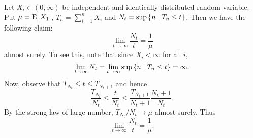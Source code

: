 \begin{example}
    Let $X_i\in(0,\infty)$ be independent and identically distributed random variable. 
    Put $\mu = \operatorname{E}\left[ {X_1} \right]$, $T_n = \sum_{i=1}^n X_i$ and $N_t = \sup\left\{ n \;\middle\vert\; T_n\leq t \right\}$. 
    Then we have the following claim: 
    \begin{equation*}
        \lim_{t\to\infty} \frac{N_t}{t} = \frac{1}{\mu} 
    \end{equation*}
    almost surely. To see this, note that since $X_i<\infty$ for all $i$, 
    \begin{equation*}
        \lim_{t\to\infty} N_t = \lim_{t\to\infty}\sup\left\{ n \;\middle\vert\; T_n\leq t \right\} = \infty. 
    \end{equation*}
    Now, observe that $T_{N_t} \leq t\leq T_{N_t+1}$ and hence 
    \begin{equation*}
        \frac{T_{N_t}}{N_t}\leq \frac{t}{N_t} \leq \frac{T_{N_t+1}}{N_t+1}\frac{N_t+1}{N_t}. 
    \end{equation*}
    By the strong law of large number, $T_{N_t}/N_t\to \mu$ almost surely. 
    Thus 
    \begin{equation*}
        \lim_{t\to\infty} \frac{N_t}{t} = \frac{1}{\mu}. 
    \end{equation*}
\end{example}

